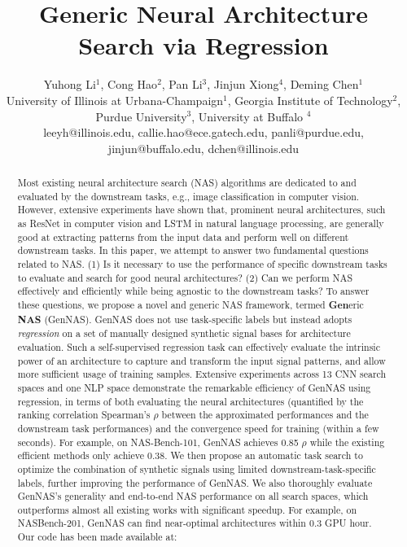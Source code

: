 \documentclass{article}
\title{Generic Neural Architecture Search via Regression}
\author{Yuhong Li$^1$, Cong Hao$^2$, Pan Li$^3$, Jinjun Xiong$^4$, Deming Chen$^1$\\
 University of Illinois at Urbana-Champaign$^1$,
 Georgia Institute of Technology$^2$,\\ Purdue University$^3$,
 University at Buffalo $^4$\\
 leeyh@illinois.edu, callie.hao@ece.gatech.edu, panli@purdue.edu, \\
 jinjun@buffalo.edu, dchen@illinois.edu
}
\begin{document}
\maketitle
\begin{abstract}
Most existing neural architecture search (NAS) algorithms are dedicated to and evaluated by the downstream tasks, e.g., image classification in computer vision. 
However, extensive experiments have shown that, prominent neural architectures, such as ResNet in computer vision and LSTM in natural language processing, are generally good at extracting patterns from the input data and perform well on different downstream tasks. 
In this paper, we attempt to answer two fundamental questions related to NAS. (1) Is it necessary to use the performance of specific downstream tasks to evaluate and search for good neural architectures? (2) Can we perform NAS effectively and efficiently while being agnostic to the downstream tasks?
To answer these questions, we propose a novel and generic NAS framework, termed \textbf{Gen}eric \textbf{NAS} (GenNAS). 
GenNAS does not use task-specific labels but instead adopts \textit{regression} on a set of manually designed synthetic signal bases for architecture evaluation. 
Such a self-supervised regression task can effectively evaluate the intrinsic power of an architecture to capture and transform the input signal patterns, 
and allow more sufficient usage of training samples. Extensive experiments across 13 CNN search spaces and one NLP space demonstrate the remarkable efficiency of GenNAS using regression, in terms of both evaluating the neural architectures (quantified by the ranking correlation Spearman's $\rho$ between the approximated performances and the downstream task performances) and the convergence speed for training (within a few seconds). For example, on NAS-Bench-101, GenNAS achieves 0.85 $\rho$ while the existing efficient methods only achieve 0.38.
We then propose an automatic task search to optimize the combination of synthetic signals using limited downstream-task-specific labels, further improving the performance of GenNAS.
We also thoroughly evaluate GenNAS's generality and end-to-end NAS performance on all search spaces,
which outperforms almost all existing works with significant speedup. For example, on NASBench-201, GenNAS can find near-optimal architectures within 0.3 GPU hour. Our code has been
made available at: \href{https://github.com/leeyeehoo/GenNAS}{\textit{\color{magenta}{https://github.com/leeyeehoo/GenNAS}}}

\end{abstract}
\end{document}
